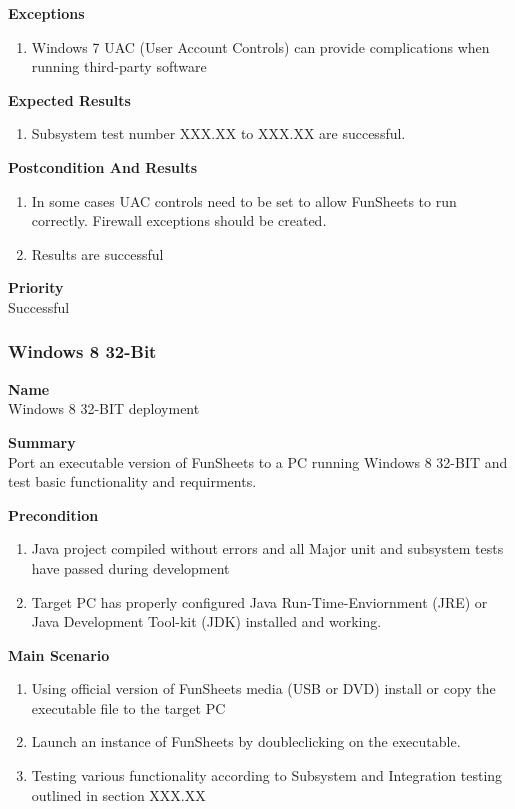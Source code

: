 \documentclass[12pt]{article}
\begin{document}
{\bf Exceptions}\
\begin{enumerate}
\item Windows 7 UAC (User Account Controls) can provide complications when running third-party software
\end{enumerate}

{\bf Expected Results}\
\begin{enumerate}
\item Subsystem test number XXX.XX to XXX.XX are successful.
\end{enumerate}

{\bf Postcondition And Results}\
\begin{enumerate}
\item In some cases UAC controls need to be set to allow FunSheets to run correctly. Firewall exceptions should be created.
\item Results are successful
\end{enumerate}

\noindent
{\bf Priority}\\
Successful
\noindent

\clearpage
\subsubsection{Windows 8 32-Bit} \label{uc:1}

\noindent
{\bf Name}\\
Windows 8 32-BIT deployment

\noindent
{\bf Summary}\\
Port an executable version of FunSheets to a PC running Windows 8 32-BIT and test basic functionality and requirments.

\noindent
{\bf Precondition}\\
\begin{enumerate}
\item Java project compiled without errors and all Major unit and subsystem tests have passed during development
\item Target PC has properly configured Java Run-Time-Enviornment (JRE) or Java Development Tool-kit (JDK) installed and working.
\end{enumerate}

\noindent
{\bf Main Scenario}\
\vspace*{-0.2in}
\begin{enumerate}
\item Using official version of FunSheets media (USB or DVD) install or copy the executable file to the target PC
\item Launch an instance of FunSheets by doubleclicking on the executable.
\item Testing various functionality according to Subsystem and Integration testing outlined in section XXX.XX
\end{enumerate}
\end{document}
